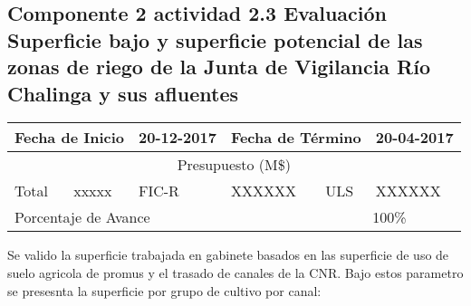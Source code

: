 \documentclass[]{article}
\begin{document}
\subsection{Componente 2 actividad  2.3 Evaluación Superficie bajo y superficie potencial de las zonas de riego de la Junta de Vigilancia Río Chalinga y sus afluentes}


\begin{table}[!htb]
\centering
\begin{tabular}{|p{2cm}|p{2cm}|p{2cm}|p{2cm}|p{2cm}|p{2cm}|}
    \hline
    \multicolumn{2}{|l|}{Fecha de Inicio} & 20-12-2017 & \multicolumn{2}{l|}{Fecha de Término} & 20-04-2017\\
    \hline
    \multicolumn{6}{|c|}{Presupuesto (M\$)}\\
    \hline
    Total & xxxxx & FIC-R & XXXXXX & ULS & XXXXXX\\
    \hline
    \multicolumn{4}{|l|}{Porcentaje de Avance} & \multicolumn{2}{c|}{100\%}\\
    \hline
\end{tabular}
\end{table}
 
 Se valido la superficie trabajada en gabinete basados en  las superficie de uso de suelo agricola de promus y el trasado de  canales de la CNR. Bajo estos parametro se presesnta la superficie por grupo de cultivo por canal:
 
\end{document}
